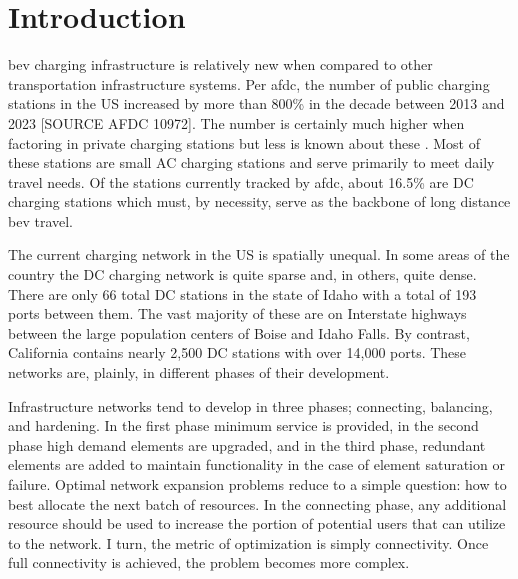 \section{Introduction}


\gls{bev} charging infrastructure is relatively new when compared to other transportation infrastructure systems. Per \gls{afdc}, the number of public charging stations in the US increased by more than 800\% in the decade between 2013 and 2023 [SOURCE AFDC 10972]. The number is certainly much higher when factoring in private charging stations but less is known about these \cite{Davis_2022}. Most of these stations are small AC charging stations and serve primarily to meet daily travel needs. Of the stations currently tracked by \gls{afdc}, about 16.5\% are DC charging stations which must, by necessity, serve as the backbone of long distance \gls{bev} travel.

The current charging network in the US is spatially unequal. In some areas of the country the DC charging network is quite sparse and, in others, quite dense. There are only 66 total DC stations in the state of Idaho with a total of 193 ports between them. The vast majority of these are on Interstate highways between the large population centers of Boise and Idaho Falls. By contrast, California contains nearly 2,500 DC stations with over 14,000 ports. These networks are, plainly, in different phases of their development. 

Infrastructure networks tend to develop in three phases; connecting, balancing, and hardening. In the first phase minimum service is provided, in the second phase high demand elements are upgraded, and in the third phase, redundant elements are added to maintain functionality in the case of element saturation or failure. Optimal network expansion problems reduce to a simple question: how to best allocate the next batch of resources. In the connecting phase, any additional resource should be used to increase the portion of potential users that can utilize to the network. I turn, the metric of optimization is simply connectivity. Once full connectivity is achieved, the problem becomes more complex.

